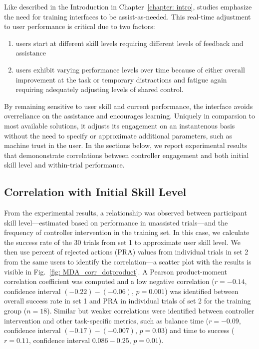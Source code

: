 Like described in the Introduction in Chapter~\ref{chapter: intro}, studies emphasize the need for training interfaces to be assist-as-needed. This real-time adjustment to user performance is critical due to two factors:
\begin{enumerate}
\item users start at different skill levels requiring different levels of feedback and assistance
\item users exhibit varying performance levels over time because of either overall improvement at the task or temporary distractions and fatigue again requiring adequately adjusting levels of shared control.
\end{enumerate}
By remaining sensitive to user skill and current performance, the interface avoids overreliance on the assistance and encourages learning. Uniquely in comparsion to most available solutions, it adjusts its engagement on an instantenous basis without the need to specify or approximate additional parameters, such as machine trust in the user. In the sections below, we report experimental results that demononstrate correlations between controller engagement and both initial skill level and within-trial performance.


\subsection{Correlation with Initial Skill Level}

From the experimental results, a relationship was observed between participant skill level---estimated based on performance in unassisted trials---and the frequency of controller intervention in the training set. In this case, we calculate the success rate of the 30 trials from set 1 to approximate user skill level. We then use percent of rejected actions (PRA) values from individual trials in set 2 from the same users to identify the correlation---a scatter plot with the results is visible in Fig.~\ref{fig: MDA_corr_dotproduct}. A Pearson product-moment correlation coefficient was computed and a low negative correlation ($r=-0.14$, confidence interval $(-0.22)-(-0.06)$, $p=0.001$) was identified between overall success rate in set 1 and PRA in individual trials of set 2 for the training group ($n=18$). Similar but weaker correlations were identified between controller intervention and other task-specific metrics, such as balance time ($r=-0.09$, confidence interval $(-0.17)-(-0.007 )$, $p=0.03$) and time to success ($r=0.11$, confidence interval $0.086-0.25$, $p=0.01$).

